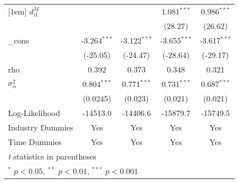 \begin{center}
\begin{tabular}{l*{4}{c}}
[1em]
$d_{i1}^{M}$     &                     &                     &       1.081$^{***}$&       0.986$^{***}$\\
            &                     &                     &     (28.27)         &     (26.62)         \\
[1em]
\_cons      &      -3.264$^{***}$&      -3.122$^{***}$&      -3.655$^{***}$&      -3.617$^{***}$\\
            &    (-25.05)         &    (-24.47)         &    (-28.64)         &    (-29.17)         \\
rho         &       0.392         &       0.373         &       0.348
                                    &       0.321         \\
$\sigma^{2}_{\alpha}$     &       0.804$^{***}$         &       0.771$^{***}$         &       0.731$^{***}$
                                    &       0.687$^{***}$         \\
& (0.0245)& (0.023)& (0.021)& (0.021) \\
Log-Likelihood         &    -14513.0         &    -14406.6         &
                                                                     -15879.7
                                    &    -15749.5         \\
\hline
Industry Dummies & Yes& Yes& Yes& Yes\\
Time Dummies& Yes& Yes& Yes& Yes\\
\hline\hline
\multicolumn{5}{l}{\footnotesize \textit{t} statistics in parentheses}\\
\multicolumn{5}{l}{\footnotesize $^{*}$ \(p<0.05\), $^{**}$ \(p<0.01\), $^{***}$ \(p<0.001\)}\\
\end{tabular}
\end{center}
